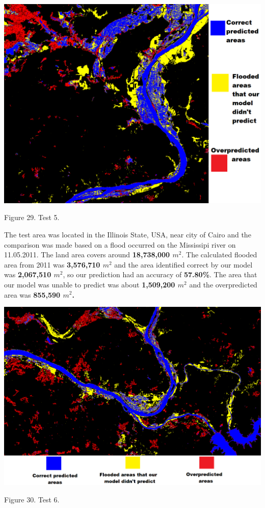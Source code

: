 \documentclass[12pt, a4paper]{report}
\begin{document}
\bigskip
\includegraphics[scale=0.5, center]{test_5.png}
\begin{center}
Figure 29. Test 5.
\end{center}
\par 

The test area was located in the Illinois State, USA, near city of Cairo and the comparison was made based on a flood occurred on the Mississipi river on 11.05.2011. The land area covers around \textbf{18,738,000 $m^2$}. The calculated flooded area from 2011 was \textbf{3,576,710 $m^2$} and the area identified correct by our model was \textbf{2,067,510 $m^2$}, so our prediction had an accuracy of \textbf{57.80\%}. The area that our model was unable to predict was about \textbf{1,509,200 $m^2$} and the overpredicted area was \textbf{855,590 $m^2$.}

\newpage

\bigskip
\includegraphics[scale=0.4, center]{test_6.png}
\begin{center}
Figure 30. Test 6.
\end{center}
\par 
\end{document}
